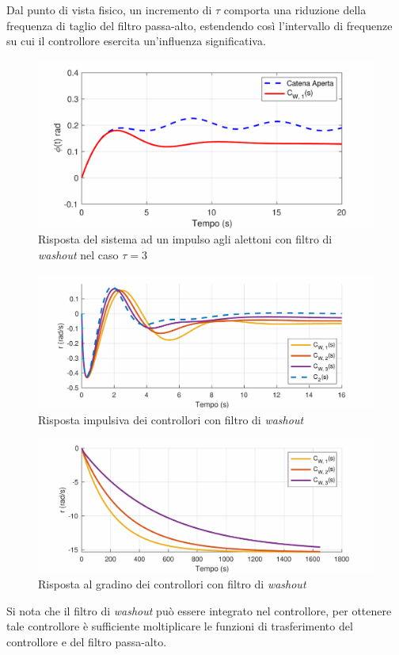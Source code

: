 Dal punto di vista fisico, un incremento di $\tau$ comporta una riduzione della frequenza di taglio del filtro passa-alto, estendendo così l'intervallo di frequenze su cui il controllore esercita un'influenza significativa.

\begin{figure}[H]
    \centering
    \includegraphics[width=0.7\linewidth]{Immagini/washout_altettone.pdf}
    \caption{Risposta del sistema ad un impulso agli alettoni con filtro di \textit{washout} nel caso $\tau = 3$}
\end{figure}


\begin{figure}[H]
    \centering
    \includegraphics[width=0.7\linewidth]{Immagini/washout_impulse.pdf}
    \caption{Risposta impulsiva dei controllori con filtro di \textit{washout}}
\end{figure}

\begin{figure}[H]
    \centering
    \includegraphics[width=0.7\linewidth]{Immagini/washout_step.pdf}
    \caption{Risposta al gradino dei controllori con filtro di \textit{washout}}
\end{figure}

\begin{note}
    Si nota che il filtro di \textit{washout} può essere integrato nel controllore, per ottenere tale controllore è sufficiente moltiplicare le funzioni di trasferimento del controllore e del filtro passa-alto.
\end{note}

